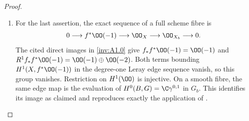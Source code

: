 \begin{proof}
\begin{enumerate}[label=\arabic*.,leftmargin=*]
\item For the last assertion, the exact sequence of a full scheme
fibre is
\[
 0\longrightarrow f^*\OO(-1)\longrightarrow\OO_X
   \longrightarrow\OO_{X_b}\longrightarrow0.
\]
The cited direct images in \ref{inv:A1.0} give
$f_*f^*\OO(-1)=\OO(-1)$ and
$R^1f_*f^*\OO(-1)=\OO(-1)\oplus\OO(-2)$.
Both terms bounding $H^1(X,f^*\OO(-1))$ in the degree-one Leray
edge sequence vanish, so this group vanishes. Restriction on
$H^1(\OO)$ is injective. On a smooth fibre, the same edge map is
the evaluation of $H^0(B,G)=\C\gamma^{0,1}$ in $G_b$.
This identifies its image as claimed and reproduces exactly
the application of \cite[Theorem~10.5(b), Step~4, p.~88]{AC2026}.
\end{enumerate}
\end{proof}